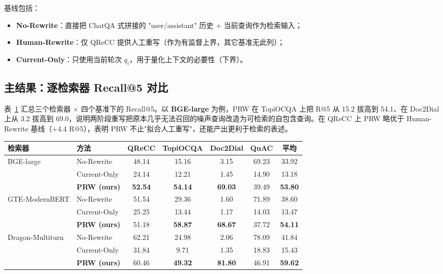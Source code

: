 基线包括：

\begin{itemize}
    \item \textbf{No-Rewrite}：直接把 ChatQA 式拼接的 "user/assistant" 历史 + 当前查询作为检索输入；
    \item \textbf{Human-Rewrite}：仅 QReCC 提供人工重写（作为有监督上界，其它基准无此列）；
    \item \textbf{Current-Only}：只使用当前轮次 $q_i$，用于量化上下文的必要性（下界）。
\end{itemize}

\subsection{主结果：逐检索器 Recall@5 对比}

表~\ref{tab:prw_main_r5} 汇总三个检索器 $\times$ 四个基准下的 Recall@5。以 \textbf{BGE-large} 为例，PRW 在 TopiOCQA 上把 R@5 从 15.2 拔高到 54.1、在 Doc2Dial 上从 3.2 拔高到 69.0，说明两阶段重写把原本几乎无法召回的噪声查询改造为可检索的自包含查询。在 QReCC 上 PRW 略优于 Human-Rewrite 基线（+4.4 R@5），表明 PRW 不止"拟合人工重写"，还能产出更利于检索的表述。

\begin{table}[h]
\centering
{}
\label{tab:prw_main_r5}
\small
\begin{tabular}{llccccc}
\toprule
检索器 & 方法 & QReCC & TopiOCQA & Doc2Dial & QuAC & 平均 \\
\midrule
\multirow{3}{*}{BGE-large}
 & No-Rewrite & 48.14 & 15.16 & 3.15 & 69.23 & 33.92 \\
 & Current-Only & 24.14 & 12.21 & 1.45 & 14.90 & 13.18 \\
 & \textbf{PRW (ours)} & \textbf{52.54} & \textbf{54.14} & \textbf{69.03} & 39.49 & \textbf{53.80} \\
\midrule
\multirow{3}{*}{GTE-ModernBERT}
 & No-Rewrite & 51.54 & 29.36 & 1.60 & 71.89 & 38.60 \\
 & Current-Only & 25.25 & 13.44 & 1.17 & 14.03 & 13.47 \\
 & \textbf{PRW (ours)} & 51.18 & \textbf{58.87} & \textbf{68.67} & 37.72 & \textbf{54.11} \\
\midrule
\multirow{3}{*}{Dragon-Multiturn}
 & No-Rewrite & 62.21 & 24.98 & 2.06 & 78.09 & 41.84 \\
 & Current-Only & 31.84 & 9.71 & 1.35 & 18.83 & 15.43 \\
 & \textbf{PRW (ours)} & 60.46 & \textbf{49.32} & \textbf{81.80} & 46.91 & \textbf{59.62} \\
\bottomrule
\end{tabular}
\end{table}

